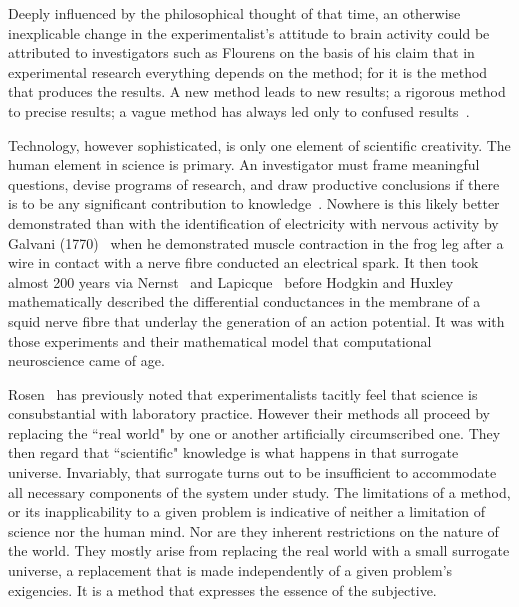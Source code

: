 \documentclass[11pt,3p,twocolumn]{JMN}
\begin{document}
Deeply influenced by the philosophical thought of that time, an otherwise inexplicable change in the experimentalist's attitude to brain activity could be attributed to investigators such as Flourens on the basis of his claim that in experimental research everything depends on the method; for it is the method that produces the results. A new method leads to new results; a rigorous method to precise results; a vague method has always led only to confused results~\citep{flourens24}.

Technology, however sophisticated, is only one element of scientific creativity. The human element in science is primary. An investigator must frame meaningful questions, devise programs of research, and draw productive conclusions if there is to be any significant contribution to knowledge~\citep{clarke87}. Nowhere is this likely better demonstrated than with the identification of electricity with nervous activity by Galvani (1770)~\citet{galvani91} when he demonstrated muscle contraction in the frog leg after a wire in contact with a nerve fibre conducted an electrical spark. It then took almost 200 years via Nernst~\citet{nernst89} and Lapicque~\citet{lapicque07} before Hodgkin and Huxley~\citet{hodgkin52e} mathematically described the differential conductances in the membrane of a squid nerve fibre that underlay the generation of an action potential. It was with those experiments and their mathematical model that computational neuroscience came of age.

Rosen~\citet{rosen96} has previously noted that experimentalists tacitly feel that science is consubstantial with laboratory practice. However their methods all proceed by replacing the ``real world" by one or another artificially circumscribed one. They then regard that ``scientific" knowledge is what happens in that surrogate universe. Invariably, that surrogate turns out to be insufficient to accommodate all necessary components of the system under study. The limitations of a method, or its inapplicability to a given problem is indicative of neither a limitation of science nor the human mind. Nor are they inherent restrictions on the nature of the world.  They mostly arise from replacing the real world with a small surrogate universe, a replacement that is made independently of a given problem's exigencies. It is a method that expresses the essence of the subjective.
\end{document}
